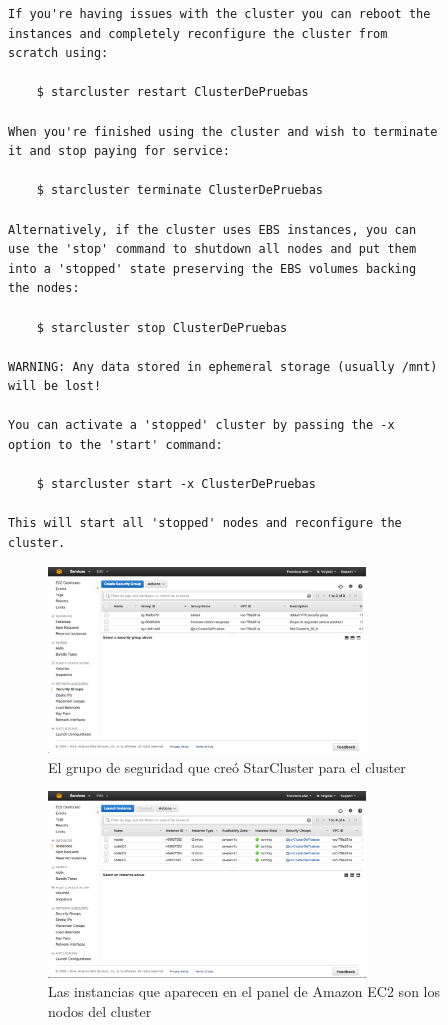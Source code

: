 \documentclass{article}
\begin{document}
\begin{lstlisting}[style=miniBash]
If you're having issues with the cluster you can reboot the
instances and completely reconfigure the cluster from
scratch using:

    $ starcluster restart ClusterDePruebas

When you're finished using the cluster and wish to terminate
it and stop paying for service:

    $ starcluster terminate ClusterDePruebas

Alternatively, if the cluster uses EBS instances, you can
use the 'stop' command to shutdown all nodes and put them
into a 'stopped' state preserving the EBS volumes backing
the nodes:

    $ starcluster stop ClusterDePruebas

WARNING: Any data stored in ephemeral storage (usually /mnt)
will be lost!

You can activate a 'stopped' cluster by passing the -x
option to the 'start' command:

    $ starcluster start -x ClusterDePruebas

This will start all 'stopped' nodes and reconfigure the
cluster.
\end{lstlisting}

\begin{figure}[h]
  \centering
    \includegraphics[width=0.75\textwidth]{img/ClusterDePruebasSG.png}
  \caption{El grupo de seguridad que creó StarCluster para el cluster}
  \label{fig:ClusterDePruebasSG}
\end{figure}
\begin{figure}[h]
  \centering
    \includegraphics[width=0.75\textwidth]{img/ClusterDePruebasNODES.png}
  \caption{Las instancias que aparecen en el panel de Amazon EC2 son los nodos del cluster}
  \label{fig:ClusterDePruebasNODES}
\end{figure}
\end{document}
